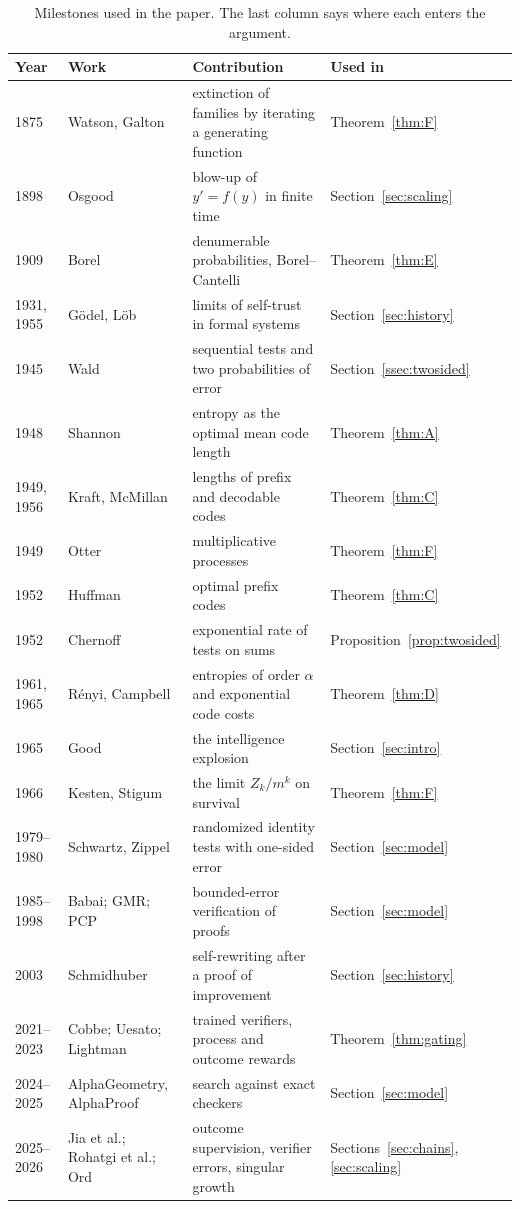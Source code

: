 \begin{table}[t]
\caption{Milestones used in the paper. The last column says where each enters the argument.}
\label{tab:history}
\centering
\small
\begin{tabular}{@{}l l p{\histcolw} l@{}}
\toprule
Year & Work & Contribution & Used in \\
\midrule
1875 & Watson, Galton \cite{WG75} & extinction of families by iterating a generating function & Theorem~\ref{thm:F} \\
1898 & Osgood \cite{Osg98} & blow-up of $y'=f(y)$ in finite time & Section~\ref{sec:scaling} \\
1909 & Borel \cite{Bor09} & denumerable probabilities, Borel--Cantelli & Theorem~\ref{thm:E} \\
1931, 1955 & G\"odel, L\"ob \cite{God31,Lob55} & limits of self-trust in formal systems & Section~\ref{sec:history} \\
1945 & Wald \cite{Wal45} & sequential tests and two probabilities of error & Section~\ref{ssec:twosided} \\
1948 & Shannon \cite{Sha48} & entropy as the optimal mean code length & Theorem~\ref{thm:A} \\
1949, 1956 & Kraft, McMillan \cite{Kra49,McM56} & lengths of prefix and decodable codes & Theorem~\ref{thm:C} \\
1949 & Otter \cite{Ott49} & multiplicative processes & Theorem~\ref{thm:F} \\
1952 & Huffman \cite{Huf52} & optimal prefix codes & Theorem~\ref{thm:C} \\
1952 & Chernoff \cite{Che52} & exponential rate of tests on sums & Proposition~\ref{prop:twosided} \\
1961, 1965 & R\'enyi, Campbell \cite{Ren61,Cam65} & entropies of order $\alpha$ and exponential code costs & Theorem~\ref{thm:D} \\
1965 & Good \cite{Goo66} & the intelligence explosion & Section~\ref{sec:intro} \\
1966 & Kesten, Stigum \cite{KS66} & the limit $Z_{k}/m^{k}$ on survival & Theorem~\ref{thm:F} \\
1979--1980 & Schwartz, Zippel \cite{Sch80,Zip79} & randomized identity tests with one-sided error & Section~\ref{sec:model} \\
1985--1998 & Babai; GMR; PCP \cite{Bab85,GMR89,AS98,ALM98} & bounded-error verification of proofs & Section~\ref{sec:model} \\
2003 & Schmidhuber \cite{Sch03} & self-rewriting after a proof of improvement & Section~\ref{sec:history} \\
2021--2023 & Cobbe; Uesato; Lightman \cite{CKB21,UKK22,LKB23} & trained verifiers, process and outcome rewards & Theorem~\ref{thm:gating} \\
2024--2025 & AlphaGeometry, AlphaProof \cite{TWL24,HMS25} & search against exact checkers & Section~\ref{sec:model} \\
2025--2026 & Jia et al.; Rohatgi et al.; Ord \cite{JRX25,RSS25,Ord26} & outcome supervision, verifier errors, singular growth & Sections~\ref{sec:chains}, \ref{sec:scaling} \\
\bottomrule
\end{tabular}
\end{table}
